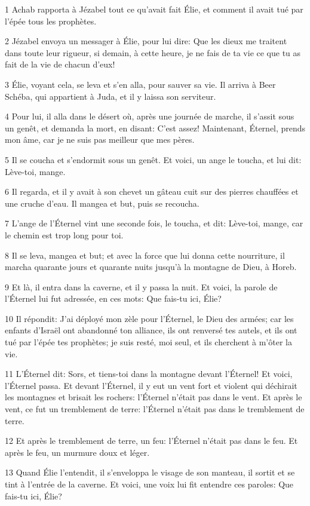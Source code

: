 \par 1 Achab rapporta à Jézabel tout ce qu'avait fait Élie, et comment il avait tué par l'épée tous les prophètes.
\par 2 Jézabel envoya un messager à Élie, pour lui dire: Que les dieux me traitent dans toute leur rigueur, si demain, à cette heure, je ne fais de ta vie ce que tu as fait de la vie de chacun d'eux!
\par 3 Élie, voyant cela, se leva et s'en alla, pour sauver sa vie. Il arriva à Beer Schéba, qui appartient à Juda, et il y laissa son serviteur.
\par 4 Pour lui, il alla dans le désert où, après une journée de marche, il s'assit sous un genêt, et demanda la mort, en disant: C'est assez! Maintenant, Éternel, prends mon âme, car je ne suis pas meilleur que mes pères.
\par 5 Il se coucha et s'endormit sous un genêt. Et voici, un ange le toucha, et lui dit: Lève-toi, mange.
\par 6 Il regarda, et il y avait à son chevet un gâteau cuit sur des pierres chauffées et une cruche d'eau. Il mangea et but, puis se recoucha.
\par 7 L'ange de l'Éternel vint une seconde fois, le toucha, et dit: Lève-toi, mange, car le chemin est trop long pour toi.
\par 8 Il se leva, mangea et but; et avec la force que lui donna cette nourriture, il marcha quarante jours et quarante nuits jusqu'à la montagne de Dieu, à Horeb.
\par 9 Et là, il entra dans la caverne, et il y passa la nuit. Et voici, la parole de l'Éternel lui fut adressée, en ces mots: Que fais-tu ici, Élie?
\par 10 Il répondit: J'ai déployé mon zèle pour l'Éternel, le Dieu des armées; car les enfants d'Israël ont abandonné ton alliance, ils ont renversé tes autels, et ils ont tué par l'épée tes prophètes; je suis resté, moi seul, et ils cherchent à m'ôter la vie.
\par 11 L'Éternel dit: Sors, et tiens-toi dans la montagne devant l'Éternel! Et voici, l'Éternel passa. Et devant l'Éternel, il y eut un vent fort et violent qui déchirait les montagnes et brisait les rochers: l'Éternel n'était pas dans le vent. Et après le vent, ce fut un tremblement de terre: l'Éternel n'était pas dans le tremblement de terre.
\par 12 Et après le tremblement de terre, un feu: l'Éternel n'était pas dans le feu. Et après le feu, un murmure doux et léger.
\par 13 Quand Élie l'entendit, il s'enveloppa le visage de son manteau, il sortit et se tint à l'entrée de la caverne. Et voici, une voix lui fit entendre ces paroles: Que fais-tu ici, Élie?
